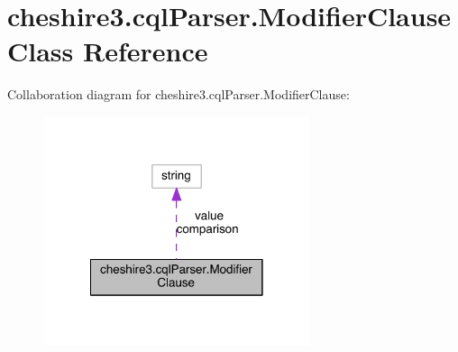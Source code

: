 \hypertarget{classcheshire3_1_1cql_parser_1_1_modifier_clause}{\section{cheshire3.\-cql\-Parser.\-Modifier\-Clause Class Reference}
\label{classcheshire3_1_1cql_parser_1_1_modifier_clause}
}


Collaboration diagram for cheshire3.\-cql\-Parser.\-Modifier\-Clause\-:
\nopagebreak
\begin{figure}[H]
\begin{center}
\leavevmode
\includegraphics[width=222pt]{classcheshire3_1_1cql_parser_1_1_modifier_clause__coll__graph}
\end{center}
\end{figure}
